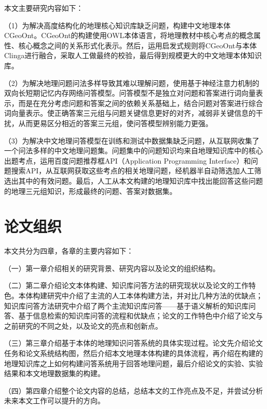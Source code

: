 本文主要研究内容如下：

（1）为解决高度结构化的地理核心知识库缺乏问题，构建中文地理本体CGeoOnt。CGeoOnt的构建使用OWL本体语言，将地理教材中核心考点的概念属性、核心概念之间的关系形式化表示。然后，运用启发式规则将CGeoOnt与本体Clinga进行融合，采取人工做最终的校验，最后得到规模更大的中文地理本体知识库。

（2）为解决地理问题问法多样导致其难以理解问题，使用基于神经注意力机制的双向长短期记忆内存网络问答模型。问答模型不是独立对问题和答案进行词向量表示，而是在充分考虑问题和答案之间的依赖关系基础上，结合问题对答案进行综合词向量表示。使正确答案三元组与问题关键信息更好的对齐，减弱非关键信息的干扰，从而更易区分相近的答案三元组，使问答模型辨别能力更强。

（3）为解决中文地理问答模型在训练和测试中数据集缺乏问题，从互联网收集了一个问法多样的中文地理问题集。问题集中的问题知识均来自地理知识库中的核心出题考点，运用百度问题推荐框API（Application Programming Interface）和问题搜索API，从互联网获取这些考点的相关地理问题，经机器半自动筛选加人工筛选出其中的有效问题。最后，人工从本文构建的地理知识库中找出能回答这些问题的地理三元组知识，形成最终的问题、答案对数据集。

\section{论文组织}
本文共分为四章，各章的主要内容如下：

（一）第一章介绍相关的研究背景、研究内容以及论文的组织结构。

（二）第二章介绍论文本体构建、知识库问答方法的研究现状以及论文的工作特色。本体构建研究中介绍了主流的人工本体构建方法，并对比几种方法的优缺点；知识库问答方法研究中介绍了两个主流知识库问答——基于语义解析的知识库问答、基于信息检索的知识库问答的流程和优缺点；论文的工作特色中介绍了论文与之前研究的不同之处，以及论文的亮点和创新点。

（三）第三章介绍基于本体的地理知识问答系统的具体实现过程。论文先介绍论文任务和论文系统结构图，然后介绍本文地理本体构建的具体流程，再介绍在构建的地理知识库之上如何构建问答系统用于回答地理问题，最后介绍论文的实验、实验结果和本文地理数据集的构建。

（四）第四章介绍整个论文内容的总结，总结本文的工作亮点及不足，并尝试分析未来本文工作可以提升的方向。